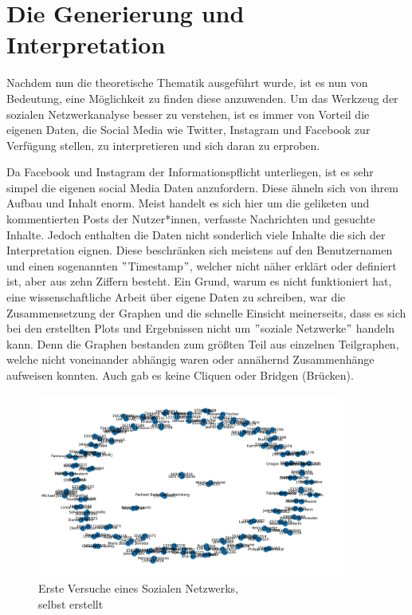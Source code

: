 \chapter{Die Generierung und Interpretation}\label{ch:generierung}
Nachdem nun die theoretische Thematik ausgeführt wurde, ist es nun von Bedeutung, eine Möglichkeit zu finden diese anzuwenden. 
Um das Werkzeug der sozialen Netzwerkanalyse besser zu verstehen, ist es immer von Vorteil die eigenen Daten, die Social Media wie Twitter, Instagram und Facebook zur Verfügung stellen, zu interpretieren und sich daran zu erproben. 

Da Facebook und Instagram der Informationspflicht unterliegen, ist es sehr simpel die eigenen social Media Daten anzufordern. Diese ähneln sich von ihrem Aufbau und Inhalt enorm. Meist handelt es sich hier um die geliketen und kommentierten Posts der Nutzer*innen, verfasste Nachrichten und gesuchte Inhalte. Jedoch enthalten die Daten nicht sonderlich viele Inhalte die sich der Interpretation eignen. Diese beschränken sich meistens auf den Benutzernamen und einen sogenannten $"$Timestamp$"$, welcher nicht näher erklärt oder definiert ist, aber aus zehn Ziffern besteht.
Ein Grund, warum es nicht funktioniert hat, eine wissenschaftliche Arbeit über eigene Daten zu schreiben, war die Zusammensetzung der Graphen und die schnelle Einsicht meinerseits, dass es sich bei den erstellten Plots und Ergebnissen nicht um $"$soziale Netzwerke$"$ handeln kann.
Denn die Graphen bestanden zum größten Teil aus einzelnen Teilgraphen, welche nicht voneinander abhängig waren oder annähernd Zusammenhänge aufweisen konnten. Auch gab es keine Cliquen oder Bridgen (Brücken). \\
\FloatBarrier
\begin{figure}[h!]
    \centering
    \includegraphics[width=0.9\textwidth]{Graphics/PlotOwnData.png}
    \caption{Erste Versuche eines Sozialen Netzwerks, \\
    selbst erstellt}
    \label{fig:OwnData}
\end{figure}
\FloatBarrier

